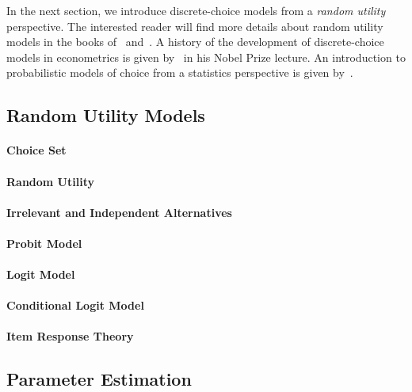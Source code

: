 In the next section, we introduce discrete-choice models from a \emph{random utility} perspective.
The interested reader will find more details about random utility models in the books of~\citet[Chapter~1]{train2009discrete} and~\citet[Chapter~3]{hensher2005applied}.
A history of the development of discrete-choice models in econometrics is given by~\citet{mcfadden2001economic} in his Nobel Prize lecture.
An introduction to probabilistic models of choice from a statistics perspective is given by~\citet[Chapter~1]{maystre2018efficient}.

\subsection{Random Utility Models}

\paragraph{Choice Set}

\paragraph{Random Utility}

\paragraph{Irrelevant and Independent Alternatives}

\paragraph{Probit Model}

\paragraph{Logit Model}

\paragraph{Conditional Logit Model}

\paragraph{Item Response Theory}

\subsection{Parameter Estimation}

